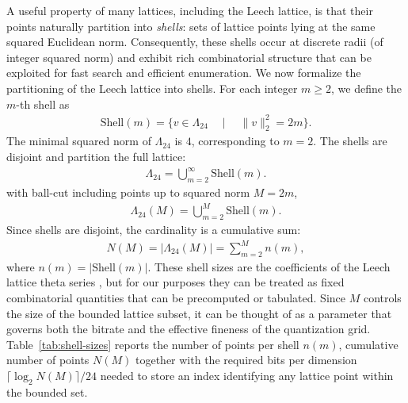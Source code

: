 \documentclass{article}
\theoremstyle{plain}
\theoremstyle{definition}
\theoremstyle{remark}
\begin{document}
A useful property of many lattices, including the Leech lattice, is that their points naturally partition into \emph{shells}: sets of lattice points lying at the same squared Euclidean norm. Consequently, these shells occur at discrete radii (of integer squared norm) and exhibit rich combinatorial structure that can be exploited for fast search and efficient enumeration. We now formalize the partitioning of the Leech lattice into shells. For each integer $m \geq 2$, we define the $m$-th shell as
\begin{align}
\text{Shell}(m) = \{ v \in \Lambda_{24} \quad \mid \quad \|v\|_2^2 = 2m \}.
\end{align}
The minimal squared norm of $\Lambda_{24}$ is $4$, corresponding to $m{=}2$. The shells are disjoint and partition the full lattice:{\setlength{\abovedisplayskip}{2pt}
\setlength{\belowdisplayskip}{1pt}
\setlength{\abovedisplayshortskip}{0pt}
\setlength{\belowdisplayshortskip}{1pt} %
\setlength{\jot}{3pt} %
\begin{align}
\Lambda_{24} = \bigcup_{m=2}^{\infty} \text{Shell}(m).
\end{align}
with ball-cut including points up to squared norm $M{=}2m$,
\begin{align}
\Lambda_{24}(M) = \bigcup_{m=2}^{M} \text{Shell}(m).
\end{align}
Since shells are disjoint, the cardinality is a cumulative sum:
\begin{align}
N(M) = |\Lambda_{24}(M)| = \sum_{m=2}^{M} n(m), 
\end{align}
}
where $n(m) = |\text{Shell}(m)|$. These shell sizes are the coefficients of the Leech lattice theta series \citep{leech1967notes}, but for our purposes they can be treated as fixed combinatorial quantities that can be precomputed or tabulated. Since $M$ controls the size of the bounded lattice subset, it can be thought of as a parameter that governs both the bitrate and the effective fineness of the quantization grid. Table~\ref{tab:shell-sizes} reports the number of points per shell $n(m)$, cumulative number of points $N(M)$ together with the required bits per dimension $\lceil \log_2 N(M) \rceil / 24$ needed to store an index identifying any lattice point within the bounded set.
\end{document}
